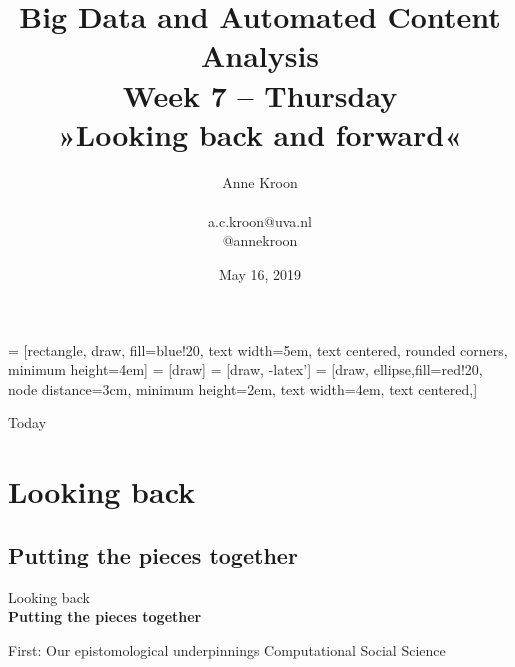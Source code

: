 \documentclass{beamer}
\begin{document}
\title[Big Data and Automated Content Analysis]{\textbf{Big Data and Automated Content Analysis} \\ Week 7 -- Thursday  \\ »Looking back and forward«}
\author[Anne Kroon]{Anne Kroon \\ ~ \\ \footnotesize{a.c.kroon@uva.nl \\@annekroon} \\}
\date{May 16, 2019}


 = [rectangle, draw, fill=blue!20, 
text width=5em, text centered, rounded corners, minimum height=4em]
 = [draw]
 = [draw, -latex']
 = [draw, ellipse,fill=red!20, node distance=3cm,
minimum height=2em, text width=4em, text centered,]

















\begin{frame}{}
\titlepage
\end{frame}

\begin{frame}{Today}
\tableofcontents
\end{frame}




\section{Looking back}
\subsection{Putting the pieces together}
\begin{frame}[plain]{}
Looking back\\
\textbf{Putting the pieces together}
\end{frame}


\begin{frame}{First: Our epistomological underpinnings}
	Computational Social Science
\end{frame}
\end{document}
